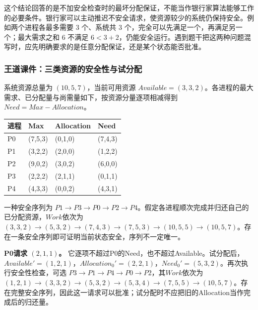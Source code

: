 这个结论回答的是不加安全检查时的最坏分配保证，不能当作银行家算法能够工作的必要条件。银行家可以主动推迟不安全请求，使资源较少的系统仍保持安全。例如两个进程各最多需要 3 个、系统共 3 个，完全可以先满足一个，再满足另一个；最大需求之和 6 不满足 \(6<3+2\)，仍能安全运行。遇到题干把这两种问题混写时，应先明确要求的是任意分配保证，还是某个状态能否批准。

\subsubsection{王道课件：三类资源的安全性与试分配}\label{OS02-course-banker}

系统资源总量为 \((10,5,7)\)，当前可用资源 \(Available=(3,3,2)\)。各进程的最大需求、已分配量与尚需量如下，按资源分量逐项相减得到 \(Need=Max-Allocation\)。

\begin{wideblock}\par\medskip\noindent\begin{minipage}{\linewidth}\fontsize{9.3}{12}\selectfont\begin{tabularx}{\linewidth}{@{}YYYY@{}}
\toprule\noalign{}
进程 & Max & Allocation & Need \\
\midrule\noalign{}


P0 & (7,5,3) & (0,1,0) & (7,4,3) \\
P1 & (3,2,2) & (2,0,0) & (1,2,2) \\
P2 & (9,0,2) & (3,0,2) & (6,0,0) \\
P3 & (2,2,2) & (2,1,1) & (0,1,1) \\
P4 & (4,3,3) & (0,0,2) & (4,3,1) \\
\bottomrule\end{tabularx}
\end{minipage}\par\medskip\end{wideblock}

一种安全序列为 \(P1\to P3\to P0\to P2\to P4\)。假定各进程顺次完成并归还自己的已分配资源，\(Work\)依次为 \((3,3,2)\to(5,3,2)\to(7,4,3)\to(7,5,3)\to(10,5,5)\to(10,5,7)\)。存在一条安全序列即可证明当前状态安全，序列不一定唯一。

\textbf{P0请求 \((2,1,1)\)。} 它逐项不超过P0的Need，也不超过Available。试分配后，\(Available'=(1,2,1)\)，\(Allocation_0'=(2,2,1)\)，\(Need_0'=(5,3,2)\)。再次执行安全性检查，可选 \(P3\to P1\to P4\to P0\to P2\)，其\(Work\)依次为 \((1,2,1)\to(3,3,2)\to(5,3,2)\to(5,3,4)\to(7,5,5)\to(10,5,7)\)。存在完整安全序列，因此这一请求可以批准；试分配时不应把旧的Allocation当作完成后的归还量。

